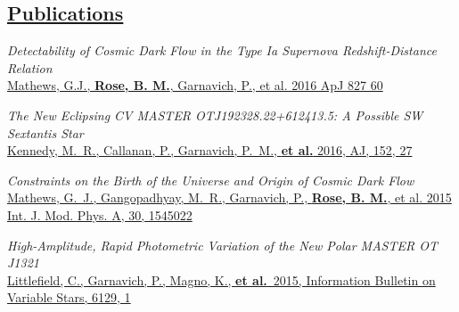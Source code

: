 \documentclass[margin]{res}
\begin{document}
\begin{resume}
\section{\href{https://ui.adsabs.harvard.edu/#search/q=orcid\%3A\%220000-0002-1873-8973\%22&sort=date\%20desc\%2C\%20bibcode\%20desc}{Publications}}

{\sl Detectability of Cosmic Dark Flow in the Type Ia Supernova Redshift-Distance \\Relation}\\
\href{https://ui.adsabs.harvard.edu/#abs/2016ApJ...827...60M/abstract}{Mathews, G.J., {\bf Rose, B. M.}, Garnavich, P., et al. 2016 ApJ 827 60}

{\sl The New Eclipsing CV MASTER OTJ192328.22+612413.5: A Possible SW Sextantis Star}\\
\href{https://ui.adsabs.harvard.edu/#abs/2016AJ....152...27K/abstract}{Kennedy, M.~R., Callanan, P., Garnavich, P.~M., {\bf et al.} 2016, AJ, 152, 27}

{\sl Constraints on the Birth of the Universe and Origin of Cosmic Dark Flow}\\
\href{https://ui.adsabs.harvard.edu/#abs/2015IJMPA..3045022M/abstract}{Mathews, G.~J., Gangopadhyay, M.~R., Garnavich, P., {\bf Rose, B. M.}, et al. 2015 Int. J. Mod. Phys. A, 30, 1545022}

{\sl High-Amplitude, Rapid Photometric Variation of the New Polar MASTER OT J1321}\\
\href{https://ui.adsabs.harvard.edu/#abs/2015IBVS.6129....1L/abstract}{Littlefield, C., Garnavich, P., Magno, K., {\bf et al.}\ 2015, Information Bulletin on Variable Stars, 6129, 1}

% 
% 






\end{resume}
\end{document}
